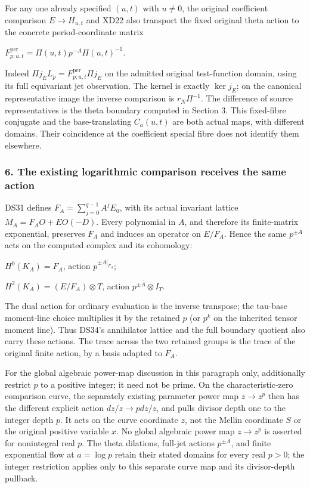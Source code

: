 For any one already specified \((u,t)\) with \(u\ne 0\), the original coefficient comparison \(E \to  H_{u,t}\) and XD22 also transport the fixed original theta action to the concrete period-coordinate matrix

\(F_{p;u,t}^{\mathrm{per}}=\Pi(u,t) p^{-A} \Pi(u,t)^{-1}\).

Indeed \(\Pi j_E L_p=F_{p;u,t}^{\mathrm{per}} \Pi j_E\) on the admitted original test-function domain, using its full equivariant jet observation. The kernel is exactly \(\ker j_E\); on the canonical representative image the inverse comparison is \(r_N \Pi^{-1}\). The difference of source representatives is the theta boundary computed in Section 3. This fixed-fibre conjugate and the base-translating \(C_a(u,t)\) are both actual maps, with different domains. Their coincidence at the coefficient special fibre does not identify them elsewhere.

\subsubsection{6. The existing logarithmic comparison receives the same action}\label{endpoint-f1_scaling--the-existing-logarithmic-comparison-receives-the-same-action}

DS31 defines \(F_A=\sum_{j=0}^{q-1}A^j E_0\), with its actual invariant lattice \(M_A=F_A O+E O(-D)\). Every polynomial in \(A\), and therefore its finite-matrix exponential, preserves \(F_A\) and induces an operator on \(E/F_A\). Hence the same \(p^{\pm A}\) acts on the computed complex and its cohomology:

\(H^0(K_A)=F_A\), action \(p^{\pm\left.A\right|_{F_A}}\);

\(H^2(K_A)=(E/F_A) \otimes T\), action \(p^{\pm\overline A}\otimes I_T\).

The dual action for ordinary evaluation is the inverse transpose; the tau-base moment-line choice multiplies it by the retained \(p\) (or \(p^k\) on the inherited tensor moment line). Thus DS34's annihilator lattice and the full boundary quotient also carry these actions. The trace across the two retained groups is the trace of the original finite action, by a basis adapted to \(F_A\).

For the global algebraic power-map discussion in this paragraph only, additionally restrict \(p\) to a positive integer; it need not be prime. On the characteristic-zero comparison curve, the separately existing parameter power map \(z\to z^p\) then has the different explicit action \(dz/z \to  p dz/z\), and pulls divisor depth one to the integer depth \(p\). It acts on the curve coordinate \(z\), not the Mellin coordinate \(S\) or the original positive variable \(x\). No global algebraic power map \(z\to z^p\) is asserted for nonintegral real \(p\). The theta dilations, full-jet actions \(p^{\pm A}\), and finite exponential flow at \(a=\log p\) retain their stated domains for every real \(p>0\); the integer restriction applies only to this separate curve map and its divisor-depth pullback.

